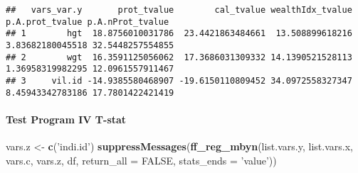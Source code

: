 \documentclass[
]{book}
\newenvironment{Shaded}{\begin{snugshade}}{\end{snugshade}}
\newcommand{\DataTypeTok}[1]{\textcolor[rgb]{0.13,0.29,0.53}{#1}}
\newcommand{\KeywordTok}[1]{\textcolor[rgb]{0.13,0.29,0.53}{\textbf{#1}}}
\newcommand{\NormalTok}[1]{#1}
\newcommand{\OtherTok}[1]{\textcolor[rgb]{0.56,0.35,0.01}{#1}}
\newcommand{\StringTok}[1]{\textcolor[rgb]{0.31,0.60,0.02}{#1}}
\begin{document}
\begin{verbatim}
##   vars_var.y       prot_tvalue        cal_tvalue wealthIdx_tvalue  p.A.prot_tvalue p.A.nProt_tvalue
## 1        hgt  18.8756010031786  23.4421863484661  13.508899618216 3.83682180045518 32.5448257554855
## 2        wgt  16.3591125056062  17.3686031309332 14.1390521528113 1.36958319982295 12.0961557911467
## 3     vil.id -14.9385580468907 -19.6150110809452 34.0972558327347 8.45943342783186 17.7801422421419
\end{verbatim}

\hypertarget{test-program-iv-t-stat}{%
\paragraph{Test Program IV T-stat}\label{test-program-iv-t-stat}}

\begin{Shaded}
\begin{Highlighting}[]
\NormalTok{vars.z <-}\StringTok{ }\KeywordTok{c}\NormalTok{(}\StringTok{'indi.id'}\NormalTok{)}
\KeywordTok{suppressMessages}\NormalTok{(}\KeywordTok{ff_reg_mbyn}\NormalTok{(list.vars.y, list.vars.x,}
\NormalTok{                             vars.c, vars.z, df,}
                             \DataTypeTok{return_all =} \OtherTok{FALSE}\NormalTok{,}
                             \DataTypeTok{stats_ends =} \StringTok{'value'}\NormalTok{))}
\end{Highlighting}
\end{Shaded}
\end{document}
